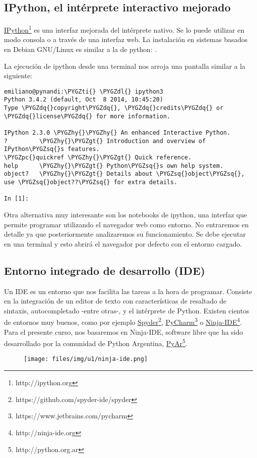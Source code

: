 \documentclass[a4paper,12pt,spanish]{sphinxmanual}
\def\PYGZgt{\char`\>}
\def\PYGZpc{\char`\%}
\def\PYGZdl{\char`\$}
\def\PYGZhy{\char`\-}
\def\PYGZsq{\char`\'}
\def\PYGZdq{\char`\"}
\def\PYGZti{\char`\~}
\renewcommand\PYGZsq{\textquotesingle}
\begin{document}
\subsection{IPython, el intérprete interactivo mejorado}
\label{Unidad01:ipython-el-interprete-interactivo-mejorado}
\href{http://ipython.org}{IPython}\footnote{http://ipython.org} es una interfaz mejorada del intérprete
nativo. Se lo puede utilizar en modo consola o a través de una interfaz
web. La instalación en sistemas basados en Debian GNU/Linux es similar a
la de python: .

La ejecución de ipython desde una terminal nos arroja una pantalla
similar a la siguiente:

\begin{Verbatim}[commandchars=\\\{\}]
emiliano@pynandi:\PYGZti{} \PYGZdl{} ipython3
Python 3.4.2 (default, Oct  8 2014, 10:45:20)
Type \PYGZdq{}copyright\PYGZdq{}, \PYGZdq{}credits\PYGZdq{} or \PYGZdq{}license\PYGZdq{} for more information.

IPython 2.3.0 \PYGZhy{}\PYGZhy{} An enhanced Interactive Python.
?         \PYGZhy{}\PYGZgt{} Introduction and overview of IPython\PYGZsq{}s features.
\PYGZpc{}quickref \PYGZhy{}\PYGZgt{} Quick reference.
help      \PYGZhy{}\PYGZgt{} Python\PYGZsq{}s own help system.
object?   \PYGZhy{}\PYGZgt{} Details about \PYGZsq{}object\PYGZsq{}, use \PYGZsq{}object??\PYGZsq{} for extra details.

In [1]:
\end{Verbatim}

Otra alternativa muy interesante son los notebooks de ipython, una
interfaz que permite programar utilizando el navegador web como entorno.
No entraremos en detalle ya que posteriormente analizaremos su
funcionamiento. Se debe ejecutar en una terminal  y
esto abrirá el navegador por defecto con el entorno cargado.


\subsection{Entorno integrado de desarrollo (IDE)}
\label{Unidad01:entorno-integrado-de-desarrollo-ide}
Un IDE es un entorno que nos facilita las tareas a la hora de programar.
Consiste en la integración de un editor de texto con características de
resaltado de sintaxis, autocompletado -entre otras-, y el intérprete de
Python. Existen cientos de entornos muy buenos, como por ejemplo
\href{https://github.com/spyder-ide/spyder}{Spyder}\footnote{https://github.com/spyder-ide/spyder},
\href{https://www.jetbrains.com/pycharm}{PyCharm}\footnote{https://www.jetbrains.com/pycharm} o
\href{http://ninja-ide.org}{Ninja-IDE}\footnote{http://ninja-ide.org}. Para el presente curso, nos
basaremos en Ninja-IDE, software libre que ha sido desarrollado por la
comunidad de Python Argentina, \href{http://python.org.ar}{PyAr}\footnote{http://python.org.ar}.
\begin{figure}[htbp]
\centering

\texttt{[image: files/img/u1/ninja-ide.png]}
\end{figure}
\end{document}

